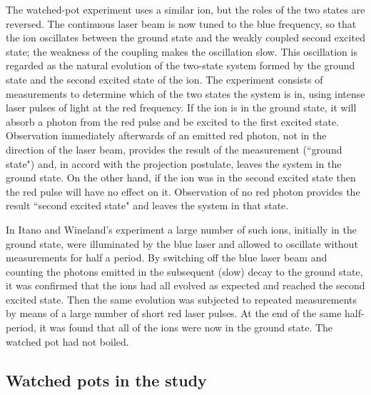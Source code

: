 \documentclass[12pt,a4paper,reqno]{article}
\renewcommand{\(}{\left(}
\renewcommand{\)}{\right)}
\newcommand{\<}{\langle}
\renewcommand{\>}{\rangle}
\theoremstyle{plain} %
\theoremstyle{definition}
\theoremstyle{remark}
\begin{document}
The watched-pot experiment \cite{watched-pot:expt} uses a similar ion,
but the roles of the two states are reversed. The continuous laser beam
is now tuned to the blue frequency, so that the ion oscillates between
the ground state and the weakly coupled second excited state; the
weakness of the coupling makes the oscillation slow. This oscillation is
regarded as the natural evolution of the two-state system formed by the
ground state and the second excited state of the ion. The experiment
consists of measurements to determine which of the two states the system
is in, using intense laser pulses of light at the red frequency. If the
ion is in the ground state, it will absorb a photon from the red pulse
and be excited to the first excited state. Observation immediately
afterwards of an emitted red photon, not in the direction of the laser
beam, provides the result of the measurement (``ground state") and, in
accord with the projection postulate, leaves the system in the ground
state. On the other hand, if the ion was in the second excited state
then the red pulse will have no effect on it. Observation of no red
photon provides the result ``second excited state" and leaves the system
in that state. 

In Itano and Wineland's experiment a large number of such ions,
initially in the ground state, were illuminated by the blue laser and
allowed to oscillate without measurements for half a period. By
switching off the blue laser beam and counting the photons emitted in
the subsequent (slow) decay to the ground state, it was confirmed that
the ions had all evolved as expected and reached the second excited
state. Then the same evolution was subjected to repeated measurements by
means of a large number of short red laser pulses. At the end of the
same half-period, it was found that all of the ions were now in the
ground state. The watched pot had not boiled. 


\subsection{Watched pots in the study}
\end{document}
